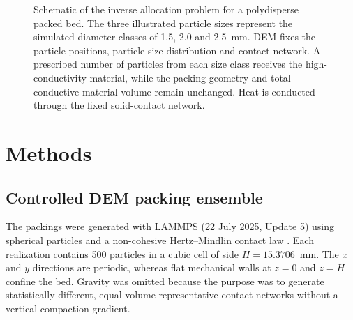 \documentclass[12pt,a4paper]{article}
\begin{document}
\begin{figure}[!htbp]
{%
	}
	
	\caption{Schematic of the inverse allocation problem for a polydisperse packed
		bed. The three illustrated particle sizes represent the simulated diameter
		classes of 1.5, 2.0 and 2.5~mm. DEM fixes the particle positions, particle-size
		distribution and contact network. A prescribed number of particles from each
		size class receives the high-conductivity material, while the packing geometry
		and total conductive-material volume remain unchanged. Heat is conducted
		through the fixed solid-contact network.}
	
	\label{fig:problem}
\end{figure}
	
	\section{Methods}
	
	\subsection{Controlled DEM packing ensemble}
	
	The packings were generated with LAMMPS (22 July 2025, Update 5) using spherical
	particles and a non-cohesive Hertz--Mindlin contact law
	\cite{CundallStrack1979,LAMMPSGranular}. Each realization contains 500 particles
	in a cubic cell of side $H=15.3706$~mm. The $x$ and $y$ directions are periodic,
	whereas flat mechanical walls at $z=0$ and $z=H$ confine the bed. Gravity was
	omitted because the purpose was to generate statistically different,
	equal-volume representative contact networks without a vertical compaction
	gradient.
	
\end{document}
